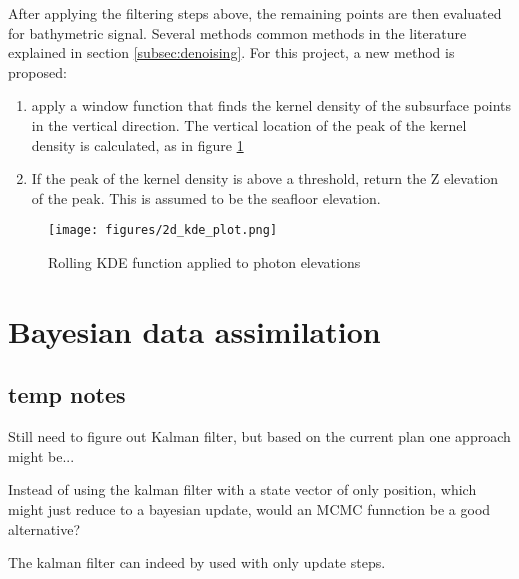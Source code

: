 After applying the filtering steps above, the remaining points are then evaluated for bathymetric signal. Several methods common methods in the literature explained in section \ref{subsec:denoising}. For this project, a new method is proposed:


\begin{enumerate}
    \item apply a window function that finds the kernel density of the subsurface points in the vertical direction. The vertical location of the peak of the kernel density is calculated, as in figure \ref{fig:kdefunc}
    \item If the peak of the kernel density is above a threshold, return the Z elevation of the peak. This is assumed to be the seafloor elevation.
\end{enumerate}

\begin{figure}[htbp]
    \centering
    \texttt{[image: figures/2d\_kde\_plot.png]}
    \caption{Rolling KDE function applied to photon elevations}
    \label{fig:kdefunc}
\end{figure}

\section{Bayesian data assimilation}
\subsection{temp notes}
Still need to figure out Kalman filter, but based on the current plan one approach might be...

Instead of using the kalman filter with a state vector of only position, which might just reduce to a bayesian update, would an MCMC funnction be a good alternative? 

The kalman filter can indeed by used with only update steps. 

